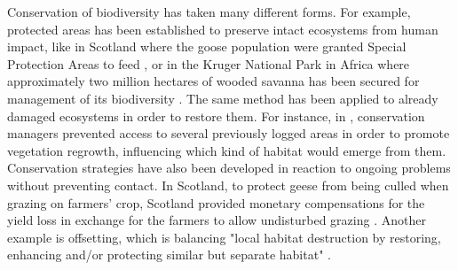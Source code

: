 \documentclass[12pt,a4paper]{article}
\begin{document}
Conservation of biodiversity has taken many different forms.
For example, protected areas has been established to preserve intact ecosystems from human impact, like in Scotland where the goose population were granted Special Protection Areas to feed \cite{bainbridge2017goose}, or in the Kruger National Park in Africa where approximately two million hectares of wooded savanna has been secured for management of its biodiversity \cite{vanwilgen2011critical}.
The same method has been applied to already damaged ecosystems in order to restore them.
For instance, in \citep{rumpff2011state}, conservation managers prevented access to several previously logged areas in order to promote vegetation regrowth, influencing which kind of habitat would emerge from them. 
Conservation strategies have also been developed in reaction to ongoing problems without preventing contact.
In Scotland, to protect geese from being culled when grazing on farmers' crop, Scotland provided monetary compensations for the yield loss in exchange for the farmers to allow undisturbed grazing \citep{bainbridge2017goose, cusack2018time}.
Another example is offsetting, which is balancing "local habitat destruction by restoring, enhancing and/or protecting similar but separate habitat" \citep{gordon2011assessing}.
\end{document}
